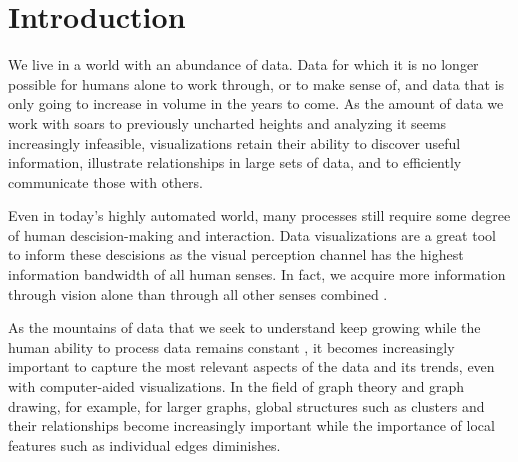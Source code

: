 \chapter{Introduction}
\label{chap:introduction}

We live in a world with an abundance of data.
Data for which it is no longer possible for humans alone to work through, or to make sense of, and data that is only going to increase in volume in the years to come.
As the amount of data we work with soars to previously uncharted heights and analyzing it seems increasingly infeasible, visualizations retain their ability to discover useful information, illustrate relationships in large sets of data, and to efficiently communicate those with others.

Even in today's highly automated world, many processes still require some degree of human descision-making and interaction.
Data visualizations are a great tool to inform these descisions as the visual perception channel has the highest information bandwidth of all human senses.
In fact, we acquire more information through vision alone than through all other senses combined \cite{ware2019information}.

As the mountains of data that we seek to understand keep growing while the human ability to process data remains constant \cite{dachsbacher2019visualisierung}, it becomes increasingly important to capture the most relevant aspects of the data and its trends, even with computer-aided visualizations.
In the field of graph theory and graph drawing, for example, for larger graphs, global structures such as clusters and their relationships become increasingly important while the importance of local features such as  individual edges diminishes.





